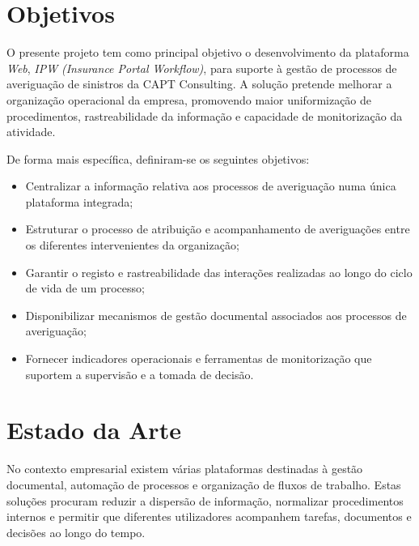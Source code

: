 \section{Objetivos}
O presente projeto tem como principal objetivo o desenvolvimento da plataforma \textit{Web}, \textit{IPW} \textit{(Insurance Portal Workflow)}, para suporte à gestão de processos de averiguação de sinistros da CAPT Consulting. A solução pretende melhorar a organização operacional da empresa, promovendo maior uniformização de procedimentos, rastreabilidade da informação e capacidade de monitorização da atividade.

De forma mais específica, definiram-se os seguintes objetivos:

\begin{itemize}
  \item Centralizar a informação relativa aos processos de averiguação numa única plataforma integrada;

  \item Estruturar o processo de atribuição e acompanhamento de averiguações entre os diferentes intervenientes da organização;

  \item Garantir o registo e rastreabilidade das interações realizadas ao longo do ciclo de vida de um processo;

  \item Disponibilizar mecanismos de gestão documental associados aos processos de averiguação;

  \item Fornecer indicadores operacionais e ferramentas de monitorização que suportem a supervisão e a tomada de decisão.

\end{itemize}


\section{Estado da Arte}
\label{sec:estado_da_arte}

No contexto empresarial existem várias plataformas destinadas à gestão documental, automação de processos e organização de fluxos de trabalho. Estas soluções procuram reduzir a dispersão de informação, normalizar procedimentos internos e permitir que diferentes utilizadores acompanhem tarefas, documentos e decisões ao longo do tempo.

